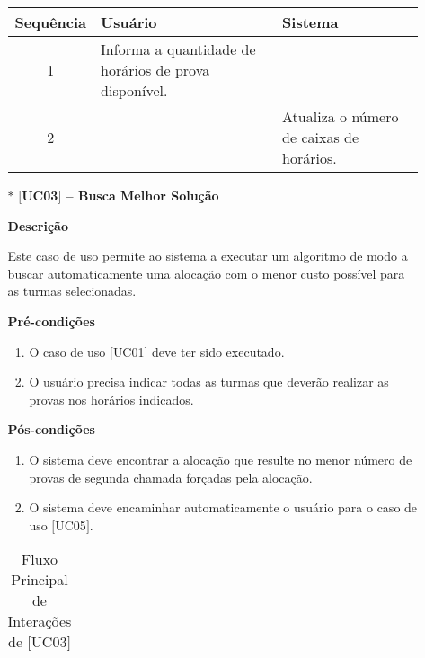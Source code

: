 \begin{itemize}
\begin{itemize}
\begin{table}[H]
\begin{tabular}{c|p{6cm}|p{6cm}}
                \textbf{Sequência} & \textbf{Usuário} & \textbf{Sistema} \\ %
                \hline                               %
                1 & Informa a quantidade de horários de prova disponível.  &  \\
                2 &   & Atualiza o número de caixas de horários.
                \\
                \hline
            \end{tabular}
        \end{table}
        
        \item[$\ast$] \textbf{$[$UC03$]$ -- Busca Melhor Solução}
        
        \textbf{Descrição}
        
        Este caso de uso permite ao sistema a executar um algoritmo de modo a buscar automaticamente uma alocação com o menor custo possível para as turmas selecionadas.
        
        \textbf{Pré-condições}
        \begin{enumerate}
            \item  O caso de uso $[$UC01$]$ deve ter sido executado.
            \item  O usuário precisa indicar todas as turmas que deverão realizar as provas nos horários indicados.
        \end{enumerate}
        
        \textbf{Pós-condições}
        \begin{enumerate}
            \item  O sistema deve encontrar a alocação que resulte no menor número de provas de segunda chamada forçadas pela alocação.
            \item O sistema deve encaminhar automaticamente o usuário para o caso de uso $[$UC05$]$.
        \end{enumerate}
        
        \begin{table}[H]
            \centering
            \caption{Fluxo Principal de Interações de $[$UC03$]$}
            \vspace{0.5cm}
            \renewcommand\arraystretch{1.5}
            \begin{tabular}{c|p{6cm}|p{6cm}}
             

\end{tabular}
\end{table}
\end{itemize}
\end{itemize}
